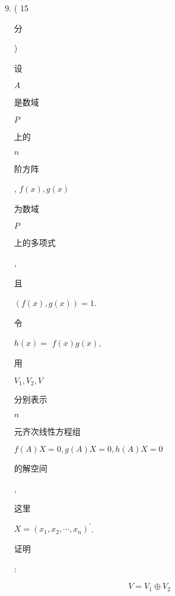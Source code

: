 \documentclass[10pt]{article}
\begin{document}
\begin{enumerate}
  \setcounter{enumi}{8}
  \item ( 15 \begin{CJK}{UTF8}{mj}分\end{CJK}) \begin{CJK}{UTF8}{mj}设\end{CJK} $A$ \begin{CJK}{UTF8}{mj}是数域\end{CJK} $P$ \begin{CJK}{UTF8}{mj}上的\end{CJK} $n$ \begin{CJK}{UTF8}{mj}阶方阵\end{CJK}, $f(x), g(x)$ \begin{CJK}{UTF8}{mj}为数域\end{CJK} $P$ \begin{CJK}{UTF8}{mj}上的多项式\end{CJK}, \begin{CJK}{UTF8}{mj}且\end{CJK} $(f(x), g(x))=1$. \begin{CJK}{UTF8}{mj}令\end{CJK} $h(x)=$ $f(x) g(x)$, \begin{CJK}{UTF8}{mj}用\end{CJK} $V_{1}, V_{2}, V$ \begin{CJK}{UTF8}{mj}分别表示\end{CJK} $n$ \begin{CJK}{UTF8}{mj}元齐次线性方程组\end{CJK} $f(A) X=0, g(A) X=0, h(A) X=0$ \begin{CJK}{UTF8}{mj}的解空间\end{CJK}, \begin{CJK}{UTF8}{mj}这里\end{CJK} $X=\left(x_{1}, x_{2}, \cdots, x_{n}\right)^{\prime}$. \begin{CJK}{UTF8}{mj}证明\end{CJK}:
\end{enumerate}
$$
V=V_{1} \oplus V_{2}
$$
\end{document}
